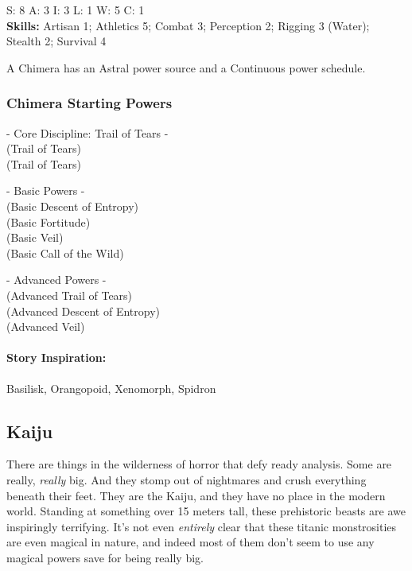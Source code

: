 S: 8 A: 3 I: 3 L: 1 W: 5 C: 1\\
\textbf{Skills:} Artisan 1; Athletics 5; Combat 3; Perception 2; Rigging 3 (Water); Stealth 2; Survival 4

A Chimera has an Astral power source and a Continuous power schedule.

\subsubsection{Chimera Starting Powers}

\hspace{\parindent} - Core Discipline: Trail of Tears -\\
 (Trail of Tears)\\
 (Trail of Tears)

- Basic Powers -\\
 (Basic Descent of Entropy)\\
 (Basic Fortitude)\\
 (Basic Veil)\\
 (Basic Call of the Wild)

- Advanced Powers -\\
 (Advanced Trail of Tears)\\
 (Advanced Descent of Entropy)\\
 (Advanced Veil)

\paragraph{Story Inspiration:} Basilisk, Orangopoid, Xenomorph, Spidron

\subsection{Kaiju} 

There are things in the wilderness of horror that defy ready analysis. Some are really, \textit{really} big. And they stomp out of nightmares and crush everything beneath their feet. They are the Kaiju, and they have no place in the modern world. Standing at something over 15 meters tall, these prehistoric beasts are awe inspiringly terrifying. It's not even \textit{entirely} clear that these titanic monstrosities are even magical in nature, and indeed most of them don't seem to use any magical powers save for being really big.

